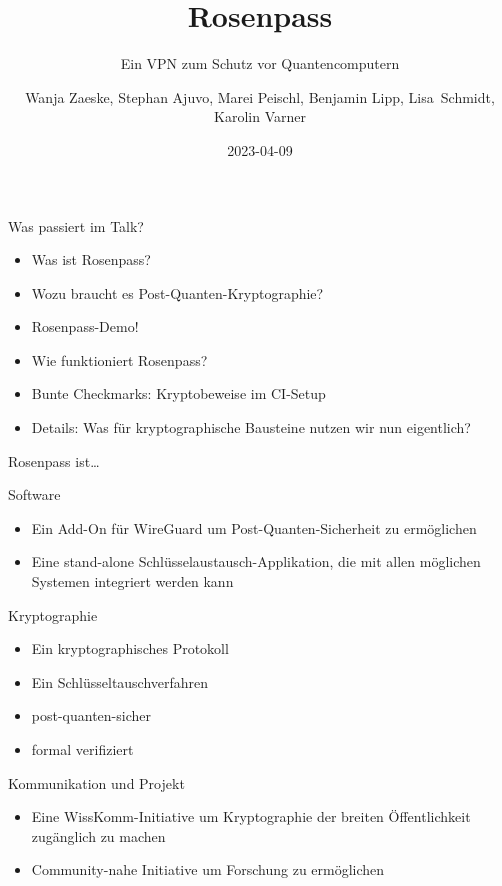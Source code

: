 \documentclass{rosenpass-beamer}
\title{Rosenpass}
\subtitle{Ein VPN zum Schutz vor Quantencomputern}
\author{Wanja Zaeske, Stephan Ajuvo, Marei Peischl, Benjamin Lipp, Lisa~Schmidt, Karolin Varner}
\institute{\url{https://rosenpass.eu}}
\date{2023-04-09}
\begin{document}
\maketitle

\begin{frame}{Was passiert im Talk?}
\begin{itemize}
  \item Was ist Rosenpass?
  \item Wozu braucht es Post-Quanten-Kryptographie?
  \item Rosenpass-Demo!
  \item Wie funktioniert Rosenpass?
  \item Bunte Checkmarks: Kryptobeweise im CI-Setup
  \item Details: Was für kryptographische Bausteine nutzen wir nun eigentlich?
\end{itemize}
\end{frame}

\begin{frame}{Rosenpass ist…}
\setlength{\leftmargini}{2em}

	Software
\begin{itemize}
  \item Ein Add-On für WireGuard um Post-Quanten-Sicherheit zu ermöglichen
  \item Eine stand-alone Schlüsselaustausch-Applikation, die mit allen möglichen Systemen integriert werden kann
\end{itemize}

Kryptographie
\begin{itemize}
  \item Ein kryptographisches Protokoll
  \item Ein Schlüsseltauschverfahren
  \item post-quanten-sicher
  \item formal verifiziert
\end{itemize}

Kommunikation und Projekt
\begin{itemize}
  \item Eine WissKomm-Initiative um Kryptographie der breiten Öffentlichkeit zugänglich zu machen
  \item Community-nahe Initiative um Forschung zu ermöglichen
\end{itemize}
\end{frame}

\end{document}
